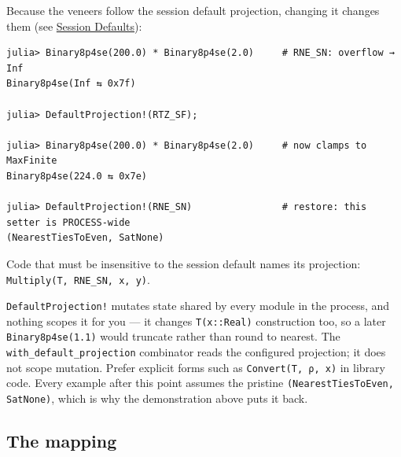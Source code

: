 Because the veneers follow the session default projection, changing it changes them (see \href{concept\_\allowbreak{}session\_\allowbreak{}state.md}{Session Defaults}):




\nopagebreak[4]
\begin{verbatim}
julia> Binary8p4se(200.0) * Binary8p4se(2.0)     # RNE_SN: overflow → Inf
Binary8p4se(Inf ⇆ 0x7f)

julia> DefaultProjection!(RTZ_SF);

julia> Binary8p4se(200.0) * Binary8p4se(2.0)     # now clamps to MaxFinite
Binary8p4se(224.0 ⇆ 0x7e)

julia> DefaultProjection!(RNE_SN)                # restore: this setter is PROCESS-wide
(NearestTiesToEven, SatNone)
\end{verbatim}



Code that must be insensitive to the session default names its projection: \texttt{Multiply(\allowbreak{}T, RNE\_\allowbreak{}SN, x, y)}.



\begin{tcolorbox}[toptitle=-1mm,bottomtitle=1mm,colback=admonition-warning!50!white,colframe=admonition-warning,title=\textbf{Restore what you set}]
\texttt{DefaultProjection!} mutates state shared by every module in the process, and nothing scopes it for you — it changes \texttt{T(x::Real)} construction too, so a later \texttt{Binary8p4se(1.1)} would truncate rather than round to nearest. The \texttt{with\_\allowbreak{}default\_\allowbreak{}projection} combinator reads the configured projection; it does not scope mutation. Prefer explicit forms such as \texttt{Convert(T, ρ, x)} in library code. Every example after this point assumes the pristine \texttt{(\allowbreak{}NearestTiesToEven, SatNone)}, which is why the demonstration above puts it back.

\end{tcolorbox}


\subsection{The mapping}



\label{12864072587101288386}{}



